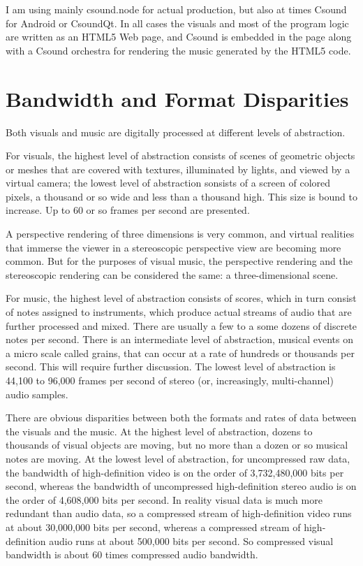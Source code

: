 \documentclass[english,11pt,letterpaper,onecolumn]{scrartcl}
\begin{document}
I am using mainly csound.node for actual production, but also at times Csound 
for Android or CsoundQt. In all cases the visuals and most of the program 
logic are written as an HTML5 Web page, and Csound is embedded in the page 
along with a Csound orchestra for rendering the music generated by the HTML5 
code.

\section{Bandwidth and Format Disparities}

Both visuals and music are digitally processed at different levels of 
abstraction. 

For visuals, the highest level of abstraction consists of scenes 
of geometric objects or meshes that are covered with textures, illuminated by 
lights, and viewed by a virtual camera; the lowest level of abstraction 
sonsists of a screen of colored pixels, a thousand or so 
wide and less than a thousand high. This size is bound to increase. Up to 60 
or so frames per second are presented. 

A perspective rendering of three 
dimensions is very common, and virtual realities that immerse the viewer in a 
stereoscopic perspective view are becoming more common. But for the purposes 
of visual music, the perspective rendering and the stereoscopic rendering can 
be considered the same: a three-dimensional scene.

For music, the highest level of abstraction consists of scores, which in turn 
consist of notes assigned to instruments, which produce actual streams of 
audio that are further processed and mixed. There are usually a few to 
a some dozens of discrete notes per second. There is an intermediate level of 
abstraction, musical events on a micro scale called grains, that can occur 
at a rate of hundreds or thousands per second. This will require further 
discussion. The lowest level of abstraction is 44,100 to 
96,000 frames per second of stereo (or, increasingly, multi-channel) audio 
samples.

There are obvious disparities between both the formats and rates of data 
between the visuals and the music. At the highest level of abstraction, dozens 
to thousands of visual objects are moving, but no more than a dozen or so 
musical notes are moving. At the lowest level of abstraction, for uncompressed 
raw data, the bandwidth of high-definition video is on the order of 
3,732,480,000 bits per second, whereas the bandwidth of uncompressed 
high-definition stereo audio is on the order of 4,608,000 bits per second. In 
reality visual data is much more redundant than audio data, so a compressed 
stream of high-definition video runs at about 30,000,000 bits per second, 
whereas a compressed stream of high-definition audio runs at about 500,000 bits 
per second. So compressed visual bandwidth is about 60 times compressed audio 
bandwidth.
\end{document}
